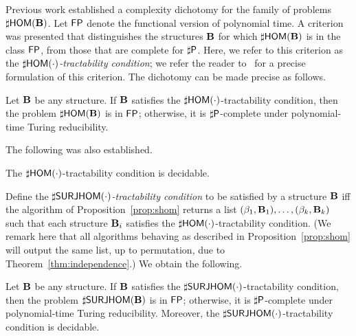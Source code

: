 \documentclass[11pt]{article}
\begin{document}
Previous work established a complexity dichotomy 
for the family of problems $\sharp\mathsf{HOM}(\mathbf{B})$.
Let $\mathsf{FP}$ denote the functional version of polynomial time.
A criterion was presented that distinguishes the structures $\mathbf{B}$
for which $\sharp\mathsf{HOM}(\mathbf{B})$ is in the class $\mathsf{FP}$,
from those that are complete for $\mathsf{\sharp P}$.  
Here, we refer to this criterion
as the \emph{$\sharp\mathsf{HOM}(\cdot)$-tractability condition};
we refer the reader to~\cite{DyerRicherby13-effective-dichotomy-counting} for a precise formulation of this criterion.
The dichotomy can be made precise as follows.

\begin{theorem} \cite{Bulatov13-counting,DyerRicherby13-effective-dichotomy-counting}
\label{thm:chom-dichotomy}
Let $\mathbf{B}$ be any structure.
If $\mathbf{B}$ satisfies the $\sharp\mathsf{HOM}(\cdot)$-tractability condition,
then the problem $\sharp\mathsf{HOM}(\mathbf{B})$ is in $\mathsf{FP}$;
otherwise, it is $\mathsf{\sharp P}$-complete under polynomial-time Turing reducibility.
\end{theorem}

The following was also established.

\begin{theorem} \cite{DyerRicherby13-effective-dichotomy-counting}
\label{thm:chom-meta-problem}
The $\sharp\mathsf{HOM}(\cdot)$-tractability condition is decidable.
\end{theorem}

Define the \emph{$\sharp\mathsf{SURJHOM}(\cdot)$-tractability condition} to
be satisfied by a structure $\mathbf{B}$ iff the algorithm of
Proposition~\ref{prop:shom} returns a list
$(\beta_1,\mathbf{B}_1),\ldots,(\beta_k,\mathbf{B}_k)$
such that each structure $\mathbf{B}_i$ satisfies the
$\sharp\mathsf{HOM}(\cdot)$-tractability condition.
(We remark here that all algorithms behaving as described
in Proposition~\ref{prop:shom} will output the same list,
up to permutation, due to Theorem~\ref{thm:independence}.)
We obtain the following.

\begin{theorem}
\label{thm:cshom-dichotomy}
Let $\mathbf{B}$ be any structure.
If $\mathbf{B}$ satisfies the $\sharp\mathsf{SURJHOM}(\cdot)$-tractability condition,
then the problem $\sharp\mathsf{SURJHOM}(\mathbf{B})$ is in $\mathsf{FP}$;
otherwise, it is $\mathsf{\sharp P}$-complete under polynomial-time Turing 
reducibility.
Moreover, the $\sharp\mathsf{SURJHOM}(\cdot)$-tractability condition is decidable.
\end{theorem}
\end{document}
